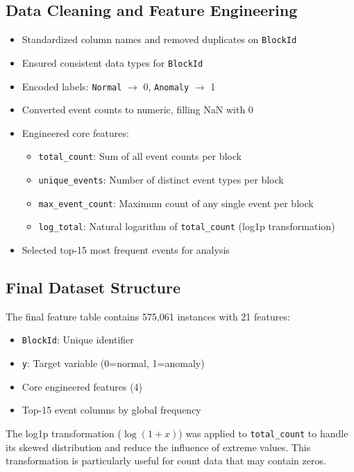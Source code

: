 \documentclass[12pt,a4paper]{article}
\theoremstyle{definition}
\theoremstyle{remark}
\newenvironment{techbox}[1][Technical Insight]{%
  \begin{tcolorbox}[
    colback=green!5!white,
    colframe=green!70!black,
    title=\textbf{#1},
    fonttitle=\bfseries
  ]
}{%
  \end{tcolorbox}
}
\begin{document}
\subsection{Data Cleaning and Feature Engineering}
\begin{itemize}
    \item Standardized column names and removed duplicates on \texttt{BlockId}
    \item Ensured consistent data types for \texttt{BlockId}
    \item Encoded labels: \texttt{Normal} $\rightarrow$ 0, \texttt{Anomaly} $\rightarrow$ 1
    \item Converted event counts to numeric, filling NaN with 0
    \item Engineered core features:
    \begin{itemize}
        \item \texttt{total\_count}: Sum of all event counts per block
        \item \texttt{unique\_events}: Number of distinct event types per block
        \item \texttt{max\_event\_count}: Maximum count of any single event per block
        \item \texttt{log\_total}: Natural logarithm of \texttt{total\_count} (log1p transformation)
    \end{itemize}
    \item Selected top-15 most frequent events for analysis
\end{itemize}

\subsection{Final Dataset Structure}
The final feature table contains 575,061 instances with 21 features:
\begin{itemize}
    \item \texttt{BlockId}: Unique identifier
    \item \texttt{y}: Target variable (0=normal, 1=anomaly)
    \item Core engineered features (4)
    \item Top-15 event columns by global frequency
\end{itemize}

\begin{techbox}[Feature Engineering Insight]
The log1p transformation ($\log(1 + x)$) was applied to \texttt{total\_count} to handle its skewed distribution and reduce the influence of extreme values. This transformation is particularly useful for count data that may contain zeros.
\end{techbox}
\end{document}
